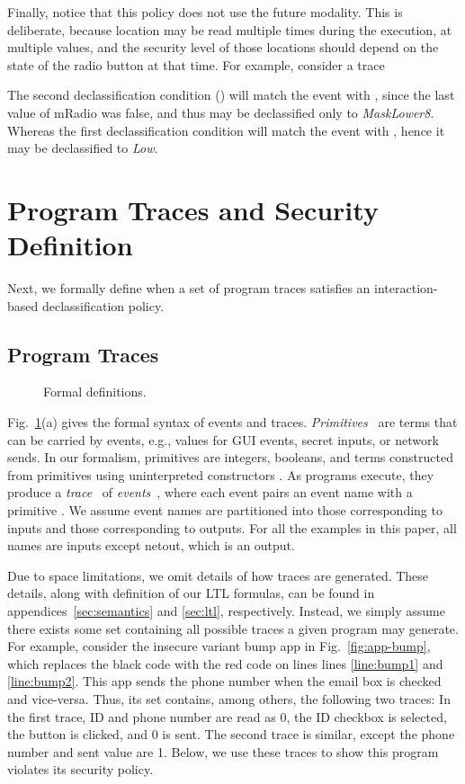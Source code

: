 \documentclass{llncs}
\newcommand{\code}[1]{\textsf{#1}} \newcommand{\bcode}[1]{\texttt{#1}}
\begin{document}
Finally, notice that this policy does not use the future
modality. This is deliberate, because location may be read multiple
times during the execution, at multiple values, and the security level
of those locations should depend on the state of the
radio button at that time. For example, consider a trace

The second declassification condition () will match the event with , since
the last value of \code{mRadio} was \code{false}, and
thus  may be declassified only to \textit{MaskLower8}. Whereas
the first declassification condition will match the event with , hence it
may be declassified to \textit{Low}.

\section{Program Traces and Security Definition}
\label{sec:formalism}

Next, we formally define when a set of program traces satisfies an
interaction-based declassification policy.

\subsection{Program Traces}
\label{sec:traces}

\begin{figure}[t!]
  \small
  \centering
  
  \caption{Formal definitions.}
  \label{fig:formalism}
\end{figure}

Fig.~\ref{fig:formalism}(a) gives the formal syntax of events and
traces.  \emph{Primitives}~ are terms that can be carried by
events, e.g., values for GUI events, secret inputs, or network
sends.  In our formalism, primitives are integers, booleans, and terms
constructed from primitives using uninterpreted constructors .  As
programs execute, they produce a \emph{trace}~ of
\emph{events}~, where each event  pairs an event name
 with a primitive . We assume event names are partitioned
into those corresponding to inputs and those corresponding to
outputs. For all the examples in this paper, all names are inputs
except \code{netout}, which is an output.

Due to space limitations, we omit details of how traces are
generated.  These details, along with definition of our LTL 
formulas, can be found in appendices~\ref{sec:semantics} and
\ref{sec:ltl}, respectively.
Instead, we simply assume there exists some set
 containing all possible traces a given program may
generate.
For example, consider the insecure variant bump app in
Fig.~\ref{fig:app-bump}, which replaces the black code with the red
code on lines lines \ref{line:bump1}
and \ref{line:bump2}.  This app sends the phone number when the
email box is checked and vice-versa. Thus, its set 
contains, among others, the following two traces:
\lstset{language=Java}In the first trace, ID and phone number are read as 0, the
ID checkbox is selected, the button is clicked, and 0 is sent.
The second trace is similar, except the phone number and sent value
are 1. Below, we use these traces to show this program
violates its security policy.
\end{document}
